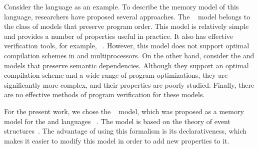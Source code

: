 Consider the \CPP language as an example.
To describe the memory model of this language, researchers have proposed several approaches.
The \RCMM~\autocite{Lahav-al:PLDI17} model belongs to the class of models that preserve program order.
This model is relatively simple and provides a number of properties useful in practice.
It also has effective verification tools, for example, \genmc~\autocite{Kokologiannakis:PLDI2019}.
However, this model does not support optimal compilation schemes in \ARM and \POWER multiprocessors. On the other hand, consider the \Prm and \Wkm models that preserve semantic dependencies. Although they support an optimal compilation scheme and a wide range of program optimizations, they are significantly more complex, and their properties are poorly studied. Finally, there are no effective methods of program verification for these models.

For the present work, we chose the  \Wkm~\autocite{Chakraborty-Vafeiadis:POPL19} model, which was proposed as a memory model for the \CPP and \LLVM languages%
~\autocite{Chakraborty-Vafeiadis:CGO17}.
The \Wkm model is based on the theory of event structures~\autocite{Winskel:86,Winskel:ICALP1982}.
The advantage of using this formalism is its declarativeness, which makes it easier to modify this model in order to add new properties to it.

